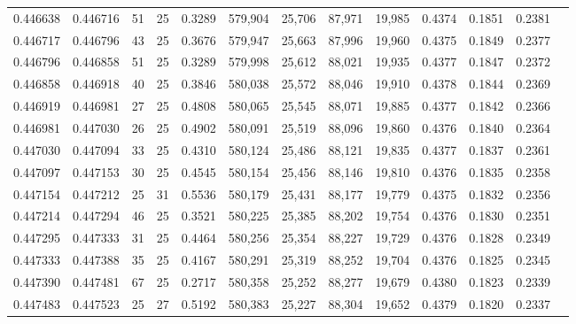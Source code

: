 \begin{tabular}{rrrrrrrrrrrrr}
0.446638 & 0.446716 &    51 &  25 &                                     0.3289 & 579,904 &  25,706 &  87,971 &  19,985 & 0.4374 & 0.1851 & 0.2381 \\
0.446717 & 0.446796 &    43 &  25 &                                     0.3676 & 579,947 &  25,663 &  87,996 &  19,960 & 0.4375 & 0.1849 & 0.2377 \\
0.446796 & 0.446858 &    51 &  25 &                                     0.3289 & 579,998 &  25,612 &  88,021 &  19,935 & 0.4377 & 0.1847 & 0.2372 \\
0.446858 & 0.446918 &    40 &  25 &                                     0.3846 & 580,038 &  25,572 &  88,046 &  19,910 & 0.4378 & 0.1844 & 0.2369 \\
0.446919 & 0.446981 &    27 &  25 &                                     0.4808 & 580,065 &  25,545 &  88,071 &  19,885 & 0.4377 & 0.1842 & 0.2366 \\
0.446981 & 0.447030 &    26 &  25 &                                     0.4902 & 580,091 &  25,519 &  88,096 &  19,860 & 0.4376 & 0.1840 & 0.2364 \\
0.447030 & 0.447094 &    33 &  25 &                                     0.4310 & 580,124 &  25,486 &  88,121 &  19,835 & 0.4377 & 0.1837 & 0.2361 \\
0.447097 & 0.447153 &    30 &  25 &                                     0.4545 & 580,154 &  25,456 &  88,146 &  19,810 & 0.4376 & 0.1835 & 0.2358 \\
0.447154 & 0.447212 &    25 &  31 &                                     0.5536 & 580,179 &  25,431 &  88,177 &  19,779 & 0.4375 & 0.1832 & 0.2356 \\
0.447214 & 0.447294 &    46 &  25 &                                     0.3521 & 580,225 &  25,385 &  88,202 &  19,754 & 0.4376 & 0.1830 & 0.2351 \\
0.447295 & 0.447333 &    31 &  25 &                                     0.4464 & 580,256 &  25,354 &  88,227 &  19,729 & 0.4376 & 0.1828 & 0.2349 \\
0.447333 & 0.447388 &    35 &  25 &                                     0.4167 & 580,291 &  25,319 &  88,252 &  19,704 & 0.4376 & 0.1825 & 0.2345 \\
0.447390 & 0.447481 &    67 &  25 &                                     0.2717 & 580,358 &  25,252 &  88,277 &  19,679 & 0.4380 & 0.1823 & 0.2339 \\
0.447483 & 0.447523 &    25 &  27 &                                     0.5192 & 580,383 &  25,227 &  88,304 &  19,652 & 0.4379 & 0.1820 & 0.2337 \\

\end{tabular}
